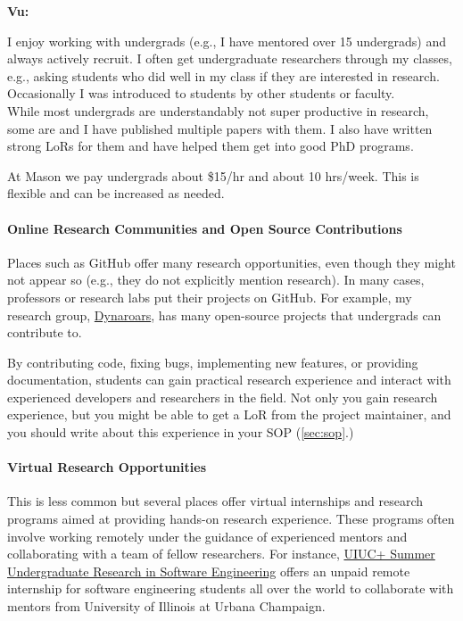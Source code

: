 \documentclass[oneside,11pt,dvipsnames]{book}
\newenvironment{commentbox}[1][]{
  \small
  \begin{mybox}
    {\small \textbf{#1}}
  }{
  \end{mybox}
}
\begin{document}
\begin{commentbox}[Vu:]
    I enjoy working with undergrads (e.g., I have mentored over 15 undergrads) and always actively recruit.
    I often get undergraduate researchers through my classes, e.g., asking students who did well in my class if they are interested in research.  Occasionally I was introduced to students by other students or faculty.\\

    While most undergrads are understandably not super productive in research, some are and I have published multiple papers with them.  I also have written strong LoRs for them and have helped them get into good PhD programs.

    \tcblower
    At Mason we pay undergrads about \$15/hr and about 10 hrs/week. This is flexible and can be increased as needed.
\end{commentbox}

\paragraph{Online Research Communities and Open Source Contributions} Places such as GitHub offer many research opportunities, even though they might not appear so (e.g., they do not explicitly mention research).
In many cases, professors or research labs put their projects on GitHub. For example, my research group, \href{https://github.com/dynaroars/}{Dynaroars}, has many open-source projects that undergrads can contribute to.

By contributing code, fixing bugs, implementing new features, or providing documentation, students can gain practical research experience and interact with experienced developers and researchers in the field. Not only you gain research experience, but you might be able to get a LoR from the project maintainer, and you should write about this experience in your SOP (\autoref{sec:sop}.)

\paragraph{Virtual Research Opportunities} This is less common but several places offer virtual internships and research programs aimed at providing hands-on research experience. These programs often involve working remotely under the guidance of experienced mentors and collaborating with a team of fellow researchers. For instance, \href{https://docs.google.com/forms/d/1btIwt4HwjyKMOUk-EMy3rbkfWzFxv2lNrMm_zkd0pA4/viewform?edit_requested=true}{UIUC+ Summer Undergraduate Research in Software Engineering}  offers an unpaid remote internship for software engineering students all over the world to collaborate with mentors from University of Illinois at Urbana Champaign.
\end{document}
